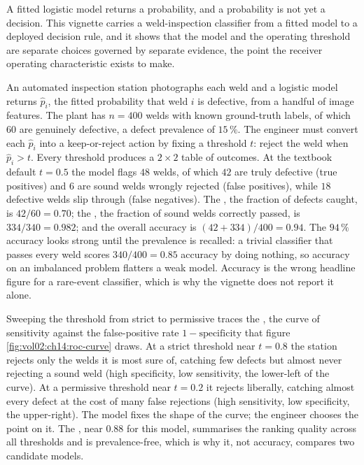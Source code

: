 A fitted logistic model returns a probability, and a probability is not
yet a decision. This vignette carries a weld-inspection classifier from
a fitted model to a deployed decision rule, and it shows that the model
and the operating threshold are separate choices governed by separate
evidence, the point the receiver operating characteristic exists to make.

An automated inspection station photographs each weld and a logistic
model returns $\hat{p}_{i}$, the fitted probability that weld $i$ is
defective, from a handful of image features. The plant has $n = 400$
welds with known ground-truth labels, of which $60$ are genuinely
defective, a defect prevalence of $15\,\%$. The engineer must convert
each $\hat{p}_{i}$ into a keep-or-reject action by fixing a threshold
$t$: reject the weld when $\hat{p}_{i} > t$. Every threshold produces a
$2\times2$ table of outcomes. At the textbook default $t = 0.5$ the
model flags $48$ welds, of which $42$ are truly defective (true
positives) and $6$ are sound welds wrongly rejected (false positives),
while $18$ defective welds slip through (false negatives). The
, the fraction of defects caught, is $42/60 =
0.70$; the , the fraction of sound welds correctly
passed, is $334/340 = 0.982$; and the overall accuracy is $(42 +
334)/400 = 0.94$. The $94\,\%$ accuracy looks strong until the
prevalence is recalled: a trivial classifier that passes every weld
scores $340/400 = 0.85$ accuracy by doing nothing, so accuracy on an
imbalanced problem flatters a weak model. Accuracy is the wrong
headline figure for a rare-event classifier, which is why the vignette
does not report it alone.

Sweeping the threshold from strict to permissive traces the
, the curve of sensitivity
against the false-positive rate $1 - \text{specificity}$ that figure
\ref{fig:vol02:ch14:roc-curve} draws. At a strict threshold near $t =
0.8$ the station rejects only the welds it is most sure of, catching few
defects but almost never rejecting a sound weld (high specificity, low
sensitivity, the lower-left of the curve). At a permissive threshold
near $t = 0.2$ it rejects liberally, catching almost every defect at the
cost of many false rejections (high sensitivity, low specificity, the
upper-right). The model fixes the shape of the curve; the engineer
chooses the point on it. The , near
$0.88$ for this model, summarises the ranking quality across all
thresholds and is prevalence-free, which is why it, not accuracy,
compares two candidate models.

